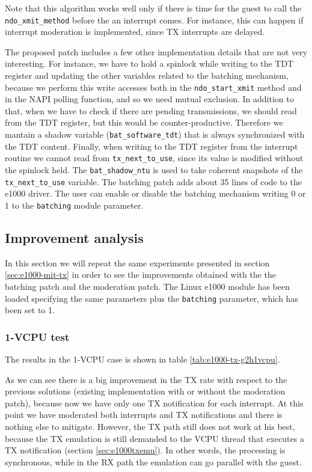 Note that this algorithm works well only if there is time for the guest to call the \texttt{ndo\_xmit\_method} before the an interrupt
comes. For instance, this can happen if interrupt moderation is implemented, since TX interrupts are delayed.

\vspace{0.5cm}

The proposed patch includes a few other implementation details that are not very interesting. For instance, we have to hold a spinlock
while writing to the TDT register and updating the other variables related to the batching mechanism, because we perform this write
accesses both in the \texttt{ndo\_start\_xmit} method and in the NAPI polling function, and so we need mutual exclusion.
In addition to that, when we have to check if there are pending transmissions, we should read from the TDT register, but this would be 
counter-productive. Therefore we mantain a shadow variable (\texttt{bat\_software\_tdt}) that is always synchronized with the TDT content.
Finally, when writing to the TDT register from the interrupt routine we cannot read from \texttt{tx\_next\_to\_use}, since its value
is modified without the spinlock held. The \texttt{bat\_shadow\_ntu} is used to take coherent snapshots of the \texttt{tx\_next\_to\_use}
variable.
The batching patch adds about 35 lines of code to the e1000 driver.
The user can enable or disable the batching mechanism writing 0 or 1 to the \texttt{batching} module parameter.


\subsection{Improvement analysis}
\label{sec:e1000-mit-bat-tx}
In this section we will repeat the same experiments presented in section \ref{sec:e1000-mit-tx} in order to see the improvements
obtained with the the batching patch and the moderation patch. The Linux e1000 module has been loaded specifying the same parameters 
plus the \texttt{batching} parameter, which has been set to 1.

\subsubsection{1-VCPU test}
The results in the 1-VCPU case is shown in table \ref{tab:e1000-tx-g2h1vcpu}.

As we can see there is a big improvement in the TX rate with respect to the previous solutions (existing implementation with or without
the moderation patch), because now we have only one TX notification for each interrupt. At this point we have moderated
both interrupts and TX notifications and there is nothing else to mitigate.
However, the TX path still does not work at his best, because the TX emulation is still demanded to the VCPU thread that executes a
TX notification (section \ref{sec:e1000txemu}). In other words, the processing is synchronous, while in the RX path the emulation can 
go parallel with the guest.

